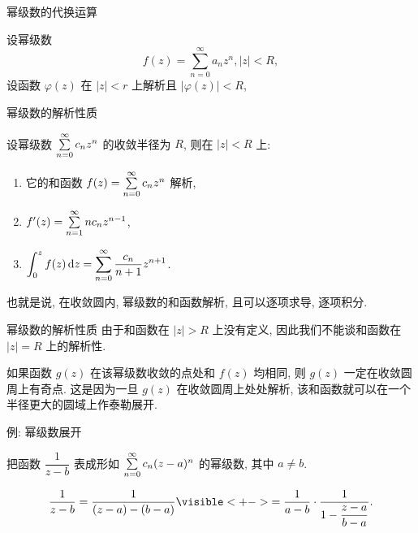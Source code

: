 \begin{frame}{幂级数的代换运算}
	\onslide<+->
	\begin{theorem}
		设幂级数
		\[f(z)=\sum_{n=0}^\infty a_nz^n,|z|<R,\]
		设函数 $\varphi(z)$ 在 $|z|<r$ 上解析且 $|\varphi(z)|<R$, 
		\onslide<+->{那么当 $|z|<r$ 时,
		\[f[\varphi(z)]=\sum_{n=0}^\infty a_n[\varphi(z)]^n.\]}
	\end{theorem}
\end{frame}


\begin{frame}{幂级数的解析性质}
	\onslide<+->
	\begin{theorem}
		设幂级数 $\sum\limits_{n=0}^\infty c_nz^n$ 的收敛半径为 $R$, 则在 $|z|<R$ 上:
		\begin{enumerate}
			\item 它的和函数 $f(z)=\sum\limits_{n=0}^\infty c_nz^n$ 解析,
			\item $f'(z)=\sum\limits_{n=1}^\infty nc_nz^{n-1}$,
			\item $\displaystyle\int_0^zf(z)\,\mathrm{d} z=\sum_{n=0}^\infty \frac{c_n}{n+1}z^{n+1}$.
		\end{enumerate}
	\end{theorem}

	\onslide<+->
	也就是说, \alert{在收敛圆内, 幂级数的和函数解析, 且可以逐项求导, 逐项积分}.
\end{frame}


\begin{frame}{幂级数的解析性质}
	\onslide<+->
	由于和函数在 $|z|>R$ 上没有定义, 因此我们不能谈和函数在 $|z|=R$ 上的解析性.

	\onslide<+->
	如果函数 $g(z)$ 在该幂级数收敛的点处和 $f(z)$ 均相同, 则 $g(z)$ \alert{一定在收敛圆周上有奇点}.
	\onslide<+->
	这是因为一旦 $g(z)$ 在收敛圆周上处处解析, 该和函数就可以在一个半径更大的圆域上作泰勒展开.
\end{frame}


\begin{frame}{例: 幂级数展开}
	\onslide<+->
	\begin{example}
		把函数 $\dfrac1{z-b}$ 表成形如 $\sum\limits_{n=0}^\infty c_n(z-a)^n$ 的幂级数, 其中 $a\neq b$.
	\end{example}

	\onslide<+->
	\begin{solution}
		\[\frac1{z-b}=\frac1{(z-a)-(b-a)}
		\visible<+->{=\frac1{a-b}\cdot\frac1{1-\dfrac{z-a}{b-a}}.}\]
		\onslide<+->{即
		\[\frac1{z-b}=-\sum_{n=0}^\infty\frac{(z-a)^n}{(b-a)^{n+1}},\quad|z-a|<|b-a|.\]}
	\end{solution}
\end{frame}


